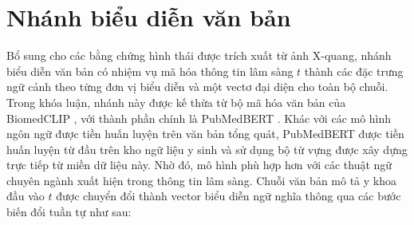 \section{Nhánh biểu diễn văn bản}
\label{sec:ch3_text_branch}
Bổ sung cho các bằng chứng hình thái được trích xuất từ ảnh X-quang, nhánh biểu diễn văn bản có nhiệm vụ mã hóa thông tin lâm sàng $t$ thành các đặc trưng ngữ cảnh theo từng đơn vị biểu diễn và một vectơ đại diện cho toàn bộ chuỗi. Trong khóa luận, nhánh này được kế thừa từ bộ mã hóa văn bản của BiomedCLIP \cite{BiomedCLIP}, với thành phần chính là PubMedBERT \cite{Gu2021PubMedBERT}. Khác với các mô hình ngôn ngữ được tiền huấn luyện trên văn bản tổng quát, PubMedBERT được tiền huấn luyện từ đầu trên kho ngữ liệu y sinh và sử dụng bộ từ vựng được xây dựng trực tiếp từ miền dữ liệu này. Nhờ đó, mô hình phù hợp hơn với các thuật ngữ chuyên ngành xuất hiện trong thông tin lâm sàng. Chuỗi văn bản mô tả y khoa đầu vào $t$ được chuyển đổi thành vector biểu diễn ngữ nghĩa thông qua các bước biến đổi tuần tự như sau:

